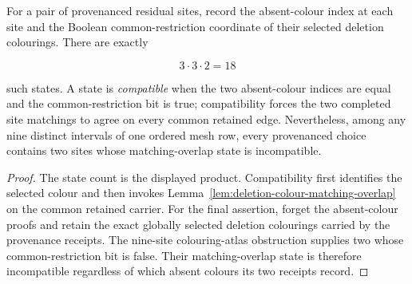 \begin{corollary}
\label{cor:nine-site-matching-overlap-obstruction}
For a pair of provenanced residual sites, record the absent-colour index at
each site and the Boolean common-restriction coordinate of their selected
deletion colourings.  There are exactly

\[
                    3\cdot 3\cdot 2=18
\]

such states.  A state is \emph{compatible} when the two absent-colour indices
are equal and the common-restriction bit is true; compatibility forces the
two completed site matchings to agree on every common retained edge.
Nevertheless, among any nine distinct intervals of one ordered mesh row,
every provenanced choice contains two sites whose matching-overlap state is
incompatible.
\end{corollary}

\begin{proof}
The state count is the displayed product.  Compatibility first identifies
the selected colour and then invokes
Lemma~\ref{lem:deletion-colour-matching-overlap} on the common retained
carrier.  For the final assertion, forget the absent-colour proofs and retain
the exact globally selected deletion colourings carried by the provenance
receipts.  The nine-site colouring-atlas obstruction supplies two whose
common-restriction bit is false.  Their matching-overlap state is therefore
incompatible regardless of which absent colours its two receipts record.
\end{proof}

